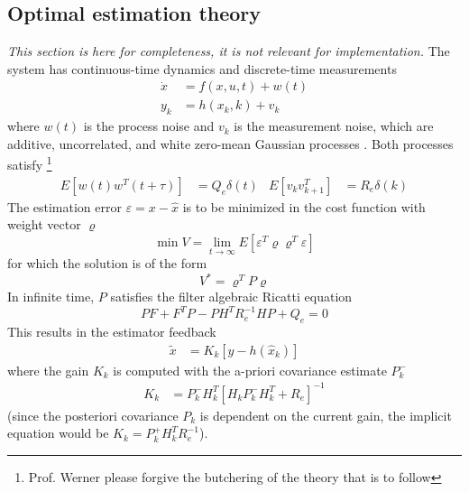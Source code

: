 \subsection{Optimal estimation theory}
\label{sec:estimator_theory}
\textit{This section is here for completeness, it is not relevant for implementation.}
The system has continuous-time dynamics and discrete-time measurements \cite{lewis2008}
\begin{align}
    \dot x &= f(x, u, t) + w(t) \\
    y_k &= h(x_k,k) + v_k
\end{align}
where $w(t)$ is the process noise and $v_k$ is the measurement noise, which are additive, uncorrelated, and white zero-mean Gaussian processes \cite{lewis2008, werner2021b}. 
Both processes satisfy \cite{werner2021b} \footnote{Prof. Werner please forgive the butchering of the theory that is to follow}
\begin{align}
    \label{eq:estimator_theory_noise}
    E\left[ w(t) w^T(t+\tau) \right] &= Q_e \delta(t)
    &
    E\left[ v_{k} v^T_{k+1} \right] &= R_e \delta(k)
\end{align}
The estimation error $\varepsilon = x - \hat x$ is to be minimized in the cost function with weight vector $\varrho$ \cite{werner2021b}
\begin{equation}
    \min V = \lim_{t \to \infty} E\left[ \varepsilon^T \varrho \varrho^T \varepsilon \right]
\end{equation}
for which the solution is of the form \cite{werner2021b}
\begin{equation}
    V^* = \varrho^T P \varrho
\end{equation}
In infinite time, $P$ satisfies the filter algebraic Ricatti equation \cite{werner2021b}
\begin{equation}
    PF + F^TP - PH^TR_e^{-1}HP + Q_e = 0
\end{equation}
This results in the estimator feedback \cite{lewis2008}
\begin{align}
    \tilde x &= K_k \left[ y - h(\hat x_k) \right]
\end{align}
where the gain $K_k$ is computed with the a-priori covariance estimate $P_k^-$
\begin{align}
    K_{k} &= P_{k}^{-} H_k^T \left[ H_k P_{k}^{-} H_k^T + R_e \right]^{-1} 
\end{align}
(since the posteriori covariance $P_k$ is dependent on the current gain, the implicit equation would be $K_k = P_k^+ H_k^T R_e^{-1}$).

